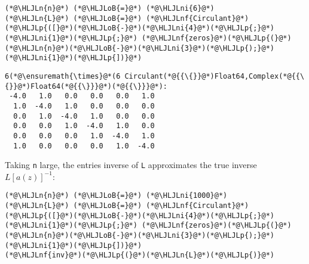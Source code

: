\documentclass[12pt,landscape]{article}
\newcommand{\HLJLn}[1]{#1}
\newcommand{\HLJLnf}[1]{\textcolor[RGB]{66,102,213}{#1}}
\newcommand{\HLJLni}[1]{\textcolor[RGB]{59,151,46}{#1}}
\newcommand{\HLJLoB}[1]{\textcolor[RGB]{102,102,102}{\textbf{#1}}}
\newcommand{\HLJLp}[1]{#1}
\begin{document}
{\begin{lstlisting}
(*@\HLJLn{n}@*) (*@\HLJLoB{=}@*) (*@\HLJLni{6}@*)
(*@\HLJLn{L}@*) (*@\HLJLoB{=}@*) (*@\HLJLnf{Circulant}@*)(*@\HLJLp{([}@*)(*@\HLJLoB{-}@*)(*@\HLJLni{4}@*)(*@\HLJLp{;}@*) (*@\HLJLni{1}@*)(*@\HLJLp{;}@*) (*@\HLJLnf{zeros}@*)(*@\HLJLp{(}@*)(*@\HLJLn{n}@*)(*@\HLJLoB{-}@*)(*@\HLJLni{3}@*)(*@\HLJLp{);}@*) (*@\HLJLni{1}@*)(*@\HLJLp{])}@*)
\end{lstlisting}

\begin{lstlisting}
6(*@\ensuremath{\times}@*(6 Circulant(*@{{\{}}@*)Float64,Complex(*@{{\{}}@*)Float64(*@{{\}}}@*)(*@{{\}}}@*):
 -4.0   1.0   0.0   0.0   0.0   1.0
  1.0  -4.0   1.0   0.0   0.0   0.0
  0.0   1.0  -4.0   1.0   0.0   0.0
  0.0   0.0   1.0  -4.0   1.0   0.0
  0.0   0.0   0.0   1.0  -4.0   1.0
  1.0   0.0   0.0   0.0   1.0  -4.0
\end{lstlisting}


Taking \texttt{n} large, the entries inverse of \texttt{L} approximates the true inverse $L[a(z)]^{-1}$:


\begin{lstlisting}
(*@\HLJLn{n}@*) (*@\HLJLoB{=}@*) (*@\HLJLni{1000}@*)
(*@\HLJLn{L}@*) (*@\HLJLoB{=}@*) (*@\HLJLnf{Circulant}@*)(*@\HLJLp{([}@*)(*@\HLJLoB{-}@*)(*@\HLJLni{4}@*)(*@\HLJLp{;}@*) (*@\HLJLni{1}@*)(*@\HLJLp{;}@*) (*@\HLJLnf{zeros}@*)(*@\HLJLp{(}@*)(*@\HLJLn{n}@*)(*@\HLJLoB{-}@*)(*@\HLJLni{3}@*)(*@\HLJLp{);}@*) (*@\HLJLni{1}@*)(*@\HLJLp{])}@*)
(*@\HLJLnf{inv}@*)(*@\HLJLp{(}@*)(*@\HLJLn{L}@*)(*@\HLJLp{)}@*)
\end{lstlisting}

}
\end{document}
